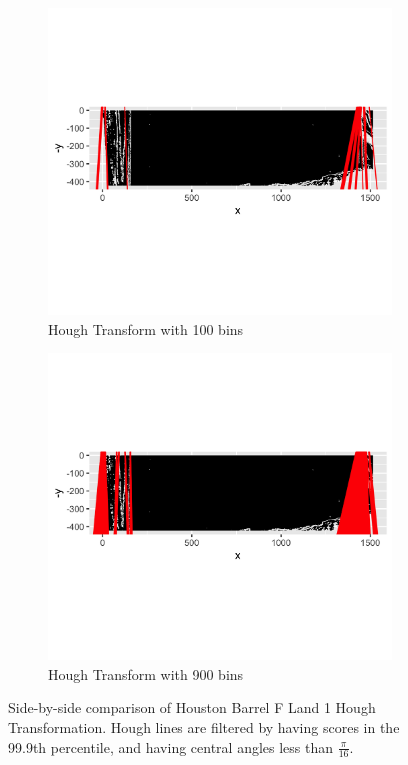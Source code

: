 \documentclass[12pt]{article}
\theoremstyle{nonumberplain}
\begin{document}
\begin{figure}[!ht]
    \centering
      \begin{subfigure}{.5\textwidth}
      \centering
      \includegraphics[width = .9\textwidth]{../images/Houston_BarrelF_Bullet1_Hough_Bin100}
      \caption{Hough Transform with 100 bins}
      \label{fig: hough1}
      \end{subfigure}%
    \begin{subfigure}{.5\textwidth}
      \centering
      \includegraphics[width = .9\textwidth]{../images/Houston_BarrelF_Bullet1_Hough_Bin900}
      \caption{Hough Transform with 900 bins}
      \label{fig: hough2}
      \end{subfigure}
      \caption{Side-by-side comparison of Houston Barrel F Land 1 Hough Transformation. Hough lines are filtered by having scores in the 99.9th percentile, and having central angles less than $\frac{\pi}{16}$.}
      \label{fig: hough-compare}
\end{figure}
\end{document}
